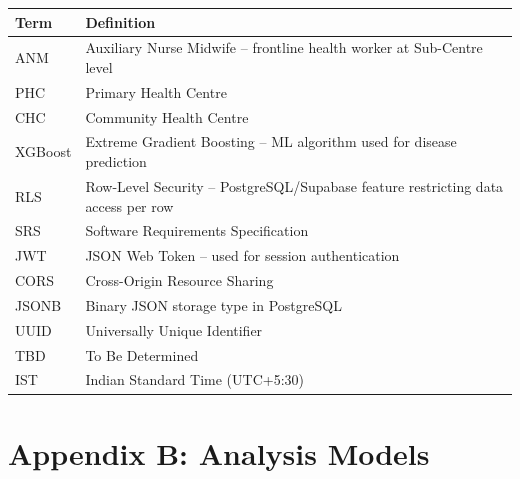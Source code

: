 \documentclass[12pt,a4paper]{article}
\begin{document}
\begin{tabular}{|p{3cm}|p{10cm}|}
    \hline
    \textbf{Term} & \textbf{Definition} \\
    \hline
    ANM & Auxiliary Nurse Midwife -- frontline health worker at Sub-Centre level \\
    \hline
    PHC & Primary Health Centre \\
    \hline
    CHC & Community Health Centre \\
    \hline
    XGBoost & Extreme Gradient Boosting -- ML algorithm used for disease prediction \\
    \hline
    RLS & Row-Level Security -- PostgreSQL/Supabase feature restricting data access per row \\
    \hline
    SRS & Software Requirements Specification \\
    \hline
    JWT & JSON Web Token -- used for session authentication \\
    \hline
    CORS & Cross-Origin Resource Sharing \\
    \hline
    JSONB & Binary JSON storage type in PostgreSQL \\
    \hline
    UUID & Universally Unique Identifier \\
    \hline
    TBD & To Be Determined \\
    \hline
    IST & Indian Standard Time (UTC+5:30) \\
    \hline
\end{tabular}

\section*{Appendix B: Analysis Models}

\end{document}
